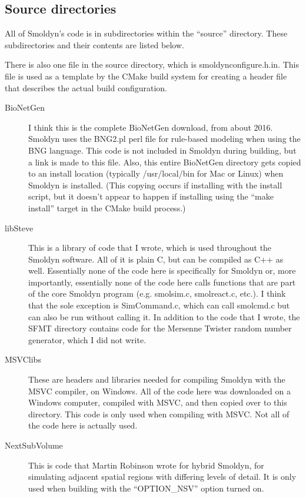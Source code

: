 \documentclass {scrbook}
\begin{document}
\subsection{Source directories}

All of Smoldyn's code is in subdirectories within the ``source'' directory. These subdirectories and their contents are listed below.

There is also one file in the source directory, which is smoldynconfigure.h.in. This file is used as a template by the CMake build system for creating a header file that describes the actual build configuration.

\begin{description}

\item[BioNetGen] I think this is the complete BioNetGen download, from about 2016. Smoldyn uses the BNG2.pl perl file for rule-based modeling when using the BNG language. This code is not included in Smoldyn during building, but a link is made to this file. Also, this entire BioNetGen directory gets copied to an install location (typically /usr/local/bin for Mac or Linux) when Smoldyn is installed. (This copying occurs if installing with the install script, but it doesn't appear to happen if installing using the ``make install'' target in the CMake build process.)

\item[libSteve] This is a library of code that I wrote, which is used throughout the Smoldyn software. All of it is plain C, but can be compiled as C++ as well. Essentially none of the code here is specifically for Smoldyn or, more importantly, essentially none of the code here calls functions that are part of the core Smoldyn program (e.g. smolsim.c, smolreact.c, etc.). I think that the sole exception is SimCommand.c, which can call smolcmd.c but can also be run without calling it. In addition to the code that I wrote, the SFMT directory contains code for the Mersenne Twister random number generator, which I did not write.

\item[MSVClibs] These are headers and libraries needed for compiling Smoldyn with the MSVC compiler, on Windows. All of the code here was downloaded on a Windows computer, compiled with MSVC, and then copied over to this directory. This code is only used when compiling with MSVC. Not all of the code here is actually used.

\item[NextSubVolume] This is code that Martin Robinson wrote for hybrid Smoldyn, for simulating adjacent spatial regions with differing levels of detail. It is only used when building with the ``OPTION\_NSV'' option turned on.


\end{description}
\end{document}
